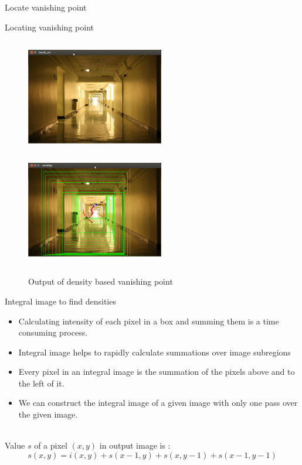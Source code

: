 \documentclass[8pt]{beamer}
\begin{document}
{{\begin{frame}{Locate vanishing point}
\end{frame}

\begin{frame}{Locating vanishing point}
 \begin{figure}
\includegraphics[width=6cm, height=5cm]{images/inputimage.png}%
\includegraphics[width=6cm, height=5cm]{images/densityop.png}%
\caption{Output of density based vanishing point}%

\end{figure}
\end{frame}

\begin{frame}{Integral image to find densities}
\begin{itemize}
\setlength\itemsep{1em}
 \item Calculating intensity of each pixel in a box and summing them is a time consuming process. 
 \item Integral image helps to rapidly calculate summations over image subregions
 \item Every pixel in an integral image is the summation of the pixels above and to the left of it. 
 \item We can construct the integral image of a given image with only one pass over the given image. 
\end{itemize}\\[5pt]
Value $s$ of a pixel $(x,y)$ in output image is : \\[2pt]
\begin{equation*}
 s(x,y) = i(x,y) + s(x-1,y) + s(x,y-1) + s(x-1,y-1)
\end{equation*}


\end{frame}}}
\end{document}
